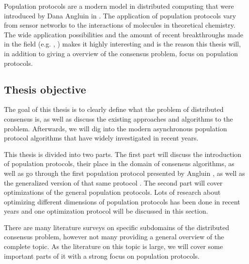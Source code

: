 Population protocols are a modern model in distributed computing that were introduced by Dana Angluin in \cite{angluinComputationNetworksPassively2006}. The application of population protocols vary from sensor networks to the interactions of molecules in theoretical chemistry. \cite{aspnesIntroductionPopulationProtocols2009} The wide application possibilities and the amount of recent breakthroughs made in the field (e.g. \cite{dotyTimeSpaceOptimal2022}, \cite{bankhamerPopulationProtocolsExact2022}) makes it highly interesting and is the reason this thesis will, in addition to giving a overview of the consensus problem, focus on population protocols.

\clearpage

\subsection{Thesis objective}
The goal of this thesis is to clearly define what the problem of distributed consensus is, as well as discuss the existing approaches and algorithms to the problem. Afterwards, we will dig into the modern asynchronous population protocol algorithms that have widely investigated in recent years. 

This thesis is divided into two parts. The first part will discuss the introduction of population protocols, their place in the domain of consensus algorithms, as well as go through the first population protocol presented by Angluin \cite{angluinSimplePopulationProtocol2008}, as well as the generalized version of that same protocol \cite{AspnesFastConverganceOfKOpinion2023}. The second part will cover optimizations of the general population protocols. Lots of research about optimizing different dimensions of population protocols has been done in recent years and one optimization protocol will be discussed in this section. 

There are many literature surveys on specific subdomains of the distributed consensus problem, however not many providing a general overview of the complete topic. As the literature on this topic is large, we will cover some important parts of it with a strong focus on population protocols.


\clearpage